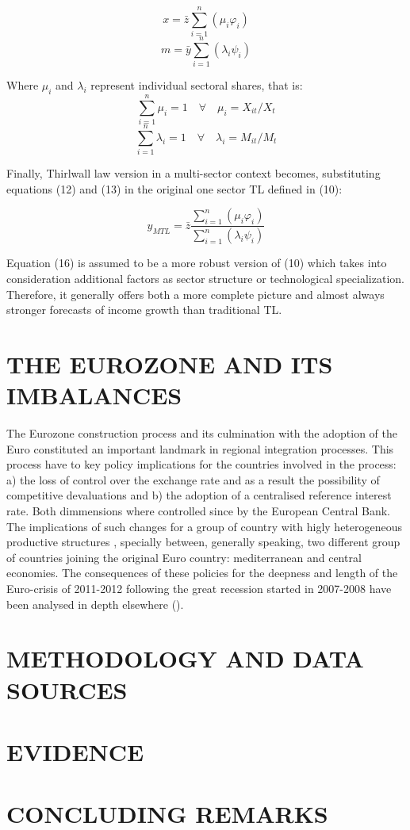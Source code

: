 \documentclass{article}
\begin{document}
\begin{equation}
  x= \bar{z} \sum_{i=1}^{n}(\mu_{i}\varphi_{i})
\end{equation}
\begin{equation}
  m= \bar{y} \sum_{i=1}^{n}(\lambda_{i}\psi_{i})
\end{equation}

Where $\mu_{i}$ and $\lambda_{i}$ represent individual sectoral shares, that is:
\begin{equation}
 \sum_{i=1}^{n}\mu_{i}=1  \quad \forall  \quad	\mu_{i} = X_{it} / X_{t}
\end{equation}
\begin{equation}
\sum_{i=1}^{n}\lambda_{i}=1 \quad \forall \quad	 \lambda_{i}= M_{it} / M_{t}
\end{equation}

Finally, Thirlwall law version in a multi-sector context becomes, substituting equations (12) and (13) in the original one sector TL defined in (10):

\begin{equation}
  y_{MTL} = {\displaystyle \bar{z}} \frac{\displaystyle \sum_{i=1}^{n}(\mu_{i}\varphi_{i})  }{\displaystyle \sum_{i=1}^{n}(\lambda_{i}\psi_{i}) }
\end{equation}

Equation (16) is assumed to be a more robust version of (10) which takes into consideration additional factors as sector structure or technological specialization. Therefore, it generally offers both a more complete picture and almost always stronger forecasts of income growth than traditional TL.

\section{THE EUROZONE AND ITS IMBALANCES}
The Eurozone construction process and its culmination with the adoption of the Euro constituted an important landmark in regional integration processes. This process have to key policy implications for the countries involved in the process: a) the loss of control over the exchange rate and as a result the possibility of competitive devaluations and b) the adoption of a centralised reference interest rate. Both dimmensions where controlled since by the European Central Bank. The implications of such changes for a group of country with higly heterogeneous productive structures , specially between, generally speaking, two different group of countries joining the original Euro country: mediterranean and central economies. The consequences of these policies for the deepness and length of the Euro-crisis of 2011-2012 following the great recession started in 2007-2008 have been analysed in depth elsewhere (\cite{stockhammer}).

\section{METHODOLOGY AND DATA SOURCES}

\section{EVIDENCE}

\section{CONCLUDING REMARKS}

\end{document}
